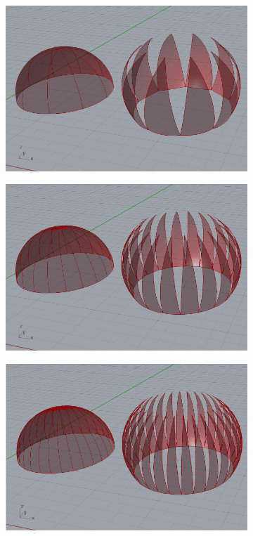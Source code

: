 \documentclass[preprint,12pt,3p]{elsarticle}
\begin{document}
\begin{figure}[h]
\begin{subfigure}{0.3\textwidth}
  \centering
  \includegraphics[width=.9\linewidth]{dome04.png}
  \caption{}
  \label{fig:dome04}
\end{subfigure}
\begin{subfigure}{0.3\textwidth}
  \centering
  \includegraphics[width=.9\linewidth]{dome05.png}
  \caption{}
  \label{fig:dome05}
\end{subfigure}
\begin{subfigure}{0.3\textwidth}
  \centering
  \includegraphics[width=.9\linewidth]{dome06.png}
  \caption{}
  \label{fig:dome06}
\end{subfigure}



\end{figure}
\end{document}

